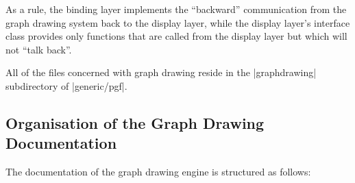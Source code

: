 \begin{enumerate}
        As a rule, the binding layer implements the ``backward'' communication
        from the graph drawing system back to the display layer, while the
        display layer's interface class provides only functions that are called
        from the display layer but which will not ``talk back''.
\end{enumerate}

All of the files concerned with graph drawing reside in the |graphdrawing|
subdirectory of |generic/pgf|.


\subsection{Organisation of the Graph Drawing Documentation}

The documentation of the graph drawing engine is structured as follows:
%
